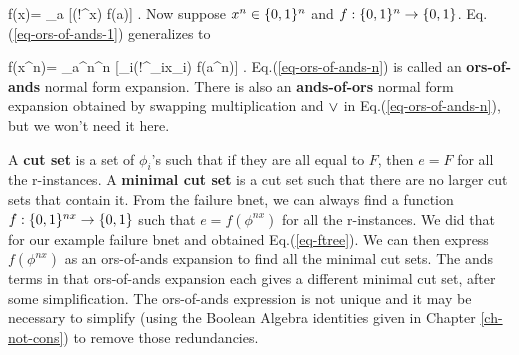 \beq
f(x)= \V_{a\in\bool} [(!^{}x) f(a)]
\label{eq-ors-of-ands-1}
\;.
\eeq
Now suppose $x^n\in \{0,1\}^n$
and $f:\{0,1\}^n\rightarrow \{0,1\}$.
Eq.(\ref{eq-ors-of-ands-1})
generalizes to

\beq
f(x^n)= \V_{a^n\in\bool^n}
 [\prod_i(!^{_i}x_i) f(a^n)]
\label{eq-ors-of-ands-n}
\;.
\eeq
Eq.(\ref{eq-ors-of-ands-n})
is called an {\bf ors-of-ands} normal form 
expansion.
There is also an {\bf ands-of-ors} normal
form expansion 
obtained by swapping multiplication
and $\vee$
in Eq.(\ref{eq-ors-of-ands-n}), 
but we won't need it here.

A {\bf cut
set} is a set
of $\phi_i$'s such that
if they are all equal to $F$,
then $e=F$ for all the
r-instances.
A {\bf minimal cut set}
is a cut set such that there
are no larger cut sets that contain it.
From the failure bnet,
we can always find 
a function $f:\{0,1\}^{nx}\rightarrow\{0,1\}$
such that
$e=f(\phi^{nx})$
for all the r-instances.
We did that for our
example failure
bnet and obtained Eq.(\ref{eq-ftree}).
We can
then
express 
$f(\phi^{nx})$ as an ors-of-ands expansion
to find all the minimal cut sets.
The ands
terms in that ors-of-ands
expansion 
each gives
a different minimal cut set,
after some simplification.
The ors-of-ands
expression
is not unique
and it may be necessary to simplify 
(using the Boolean Algebra identities
given in Chapter \ref{ch-not-cons})
to remove those redundancies.